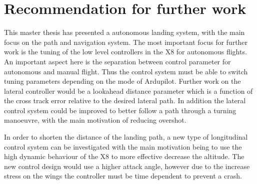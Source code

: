 %


\section{Recommendation for further work}
This master thesis has presented a autonomous landing system, with the main focus on the path and navigation system.
The most important focus for further work is the tuning of the low level controllers in the X8 for autonomous flights. An important aspect here is the separation between control parameter for autonomous and manual flight. Thus the control system must be able to switch tuning parameters depending on the mode of Ardupilot. Further work on the lateral controller would be a lookahead distance parameter which is a function of the cross track error relative to the desired lateral path. In addition the lateral control system could be improved to better follow a path through a turning manoeuvre, with the main motivation of reducing overshot.

In order to shorten the distance of the landing path, a new type of longitudinal control system can be investigated with the main motivation being to use the high dynamic behaviour of the X8 to more effective decrease the altitude. The new control design would use a higher attack angle, however due to the increase stress on the wings the controller must be time dependent to prevent a crash.


